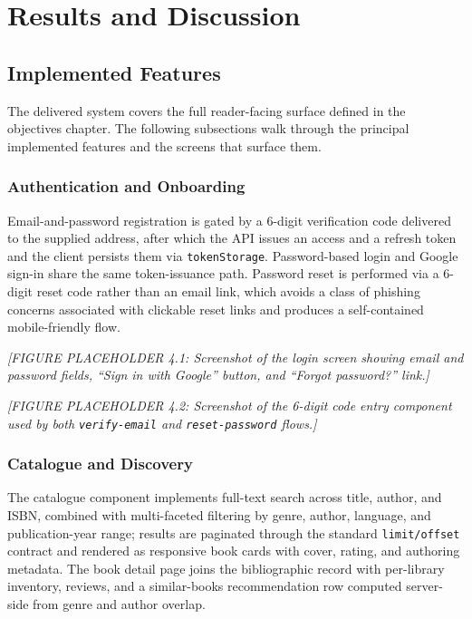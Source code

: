 \documentclass[12pt,a4paper]{report}
\begin{document}
\chapter{Results and Discussion}

\section{Implemented Features}

The delivered system covers the full reader-facing surface defined in the
objectives chapter. The following subsections walk through the principal
implemented features and the screens that surface them.

\subsection{Authentication and Onboarding}

Email-and-password registration is gated by a 6-digit verification code
delivered to the supplied address, after which the API issues an access
and a refresh token and the client persists them via \texttt{tokenStorage}.
Password-based login and Google sign-in share the same token-issuance
path. Password reset is performed via a 6-digit reset code rather than an
email link, which avoids a class of phishing concerns associated with
clickable reset links and produces a self-contained mobile-friendly flow.

\textit{[FIGURE PLACEHOLDER 4.1: Screenshot of the login screen showing
email and password fields, ``Sign in with Google'' button, and
``Forgot password?'' link.]}

\textit{[FIGURE PLACEHOLDER 4.2: Screenshot of the 6-digit code entry
component used by both \texttt{verify-email} and \texttt{reset-password}
flows.]}

\subsection{Catalogue and Discovery}

The catalogue component implements full-text search across title,
author, and ISBN, combined with multi-faceted filtering by genre,
author, language, and publication-year range; results are paginated
through the standard \texttt{limit/offset} contract and rendered as
responsive book cards with cover, rating, and authoring metadata. The
book detail page joins the bibliographic record with per-library
inventory, reviews, and a similar-books recommendation row computed
server-side from genre and author overlap.
\end{document}
